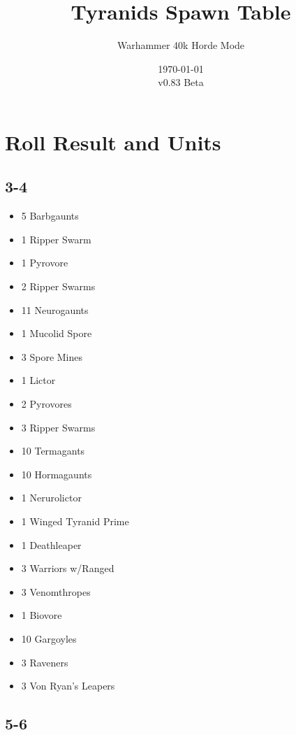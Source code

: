 \documentclass{HordeModeTarot}
\title{Tyranids Spawn Table}
\author{Warhammer 40k Horde Mode}
\date{\today \\v0.83 Beta}
\begin{document}
\maketitle

\outputUsingSpawnTableBoilerplate
\section{Roll Result and Units}\hypertarget{roll-results}{}\label{roll-results}

\begin{multicols}{2}

\subsection*{3-4}

\begin{itemize}[leftmargin=*]
\item[] 5 Barbgaunts
\item[] 1 Ripper Swarm
\item[] 1 Pyrovore
\item[] 2 Ripper Swarms
\item[] 11 Neurogaunts
\item[] 1 Mucolid Spore
\item[] 3 Spore Mines
\item[] 1 Lictor
\item[] 2 Pyrovores
\item[] 3 Ripper Swarms
\item[] 10 Termagants
\item[] 10 Hormagaunts
\item[] 1 Nerurolictor
\item[] 1 Winged Tyranid Prime
\item[] 1 Deathleaper
\item[] 3 Warriors w/Ranged
\item[] 3 Venomthropes
\item[] 1 Biovore
\item[] 10 Gargoyles
\item[] 3 Raveners
\item[] 3 Von Ryan's Leapers
\end{itemize}

\subsection*{5-6}


\end{multicols}
\end{document}
